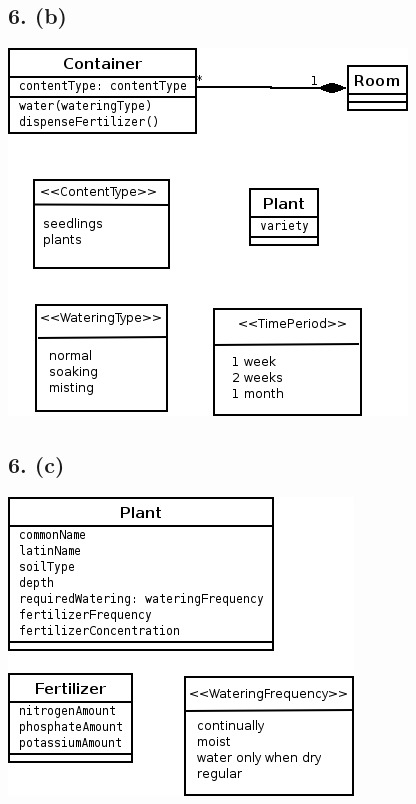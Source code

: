 \documentclass{article}[12pt]
\begin{document}
\subsection*{6. (b)}
\includegraphics[scale=0.45]{a1q6b.png}


\subsection*{6. (c)}
\includegraphics[scale=0.45]{a1q6c.png}
\end{document}
